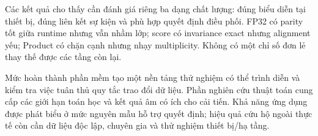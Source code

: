 Các kết quả cho thấy cần đánh giá riêng ba dạng chất lượng: đúng biểu diễn tại thiết bị, đúng liên kết sự kiện và phù hợp quyết định điều phối. FP32 có parity tốt giữa runtime nhưng vẫn nhầm lớp; score có invariance exact nhưng alignment yếu; Product có chặn cạnh nhưng nhạy multiplicity. Không có một chỉ số đơn lẻ thay thế được các tầng còn lại.

Mức hoàn thành phần mềm tạo một nền tảng thử nghiệm có thể trình diễn và kiểm tra việc tuân thủ quy tắc trao đổi dữ liệu. Phần nghiên cứu thuật toán cung cấp các giới hạn toán học và kết quả âm có ích cho cải tiến. Khả năng ứng dụng được phát biểu ở mức nguyên mẫu hỗ trợ quyết định; hiệu quả cứu hộ ngoài thực tế còn cần dữ liệu độc lập, chuyên gia và thử nghiệm thiết bị/hạ tầng.
